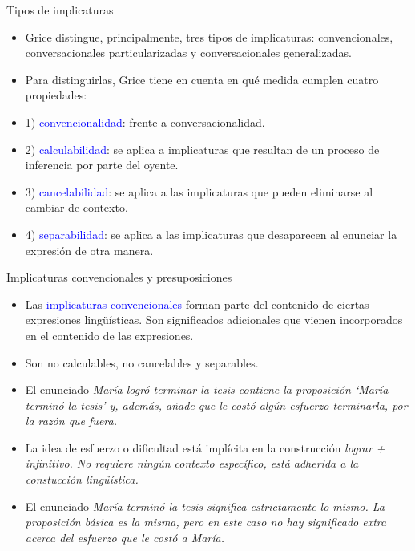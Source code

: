 \documentclass{beamer}
\begin{document}
\begin{frame}{Tipos de implicaturas}

	\begin{itemize}
		\item Grice distingue, principalmente, tres tipos de implicaturas: convencionales, conversacionales particularizadas y conversacionales generalizadas. 
		\item Para distinguirlas, Grice tiene en cuenta en qué medida cumplen cuatro propiedades:
		\item 1) \textcolor{blue}{convencionalidad}: frente a conversacionalidad.
		\item 2) \textcolor{blue}{calculabilidad}: se aplica a implicaturas que resultan de un proceso de inferencia por parte del oyente.
		\item 3) \textcolor{blue}{cancelabilidad}: se aplica a las implicaturas que pueden eliminarse al cambiar de contexto.
		\item 4) \textcolor{blue}{separabilidad}: se aplica a las implicaturas que desaparecen al enunciar la expresión de otra manera.
	\end{itemize}

\end{frame}

\begin{frame}{Implicaturas convencionales y presuposiciones}

	\begin{itemize}
		\item Las \textcolor{blue}{implicaturas convencionales} forman parte del contenido de ciertas expresiones lingüísticas. Son significados adicionales que vienen incorporados en el contenido de las expresiones.
		\item Son no calculables, no cancelables y separables.
		
		\item El enunciado \it{María logró terminar la tesis} contiene la proposición `María terminó la tesis' y, además, añade que le costó algún esfuerzo terminarla, por la razón que fuera.
		
		\item La idea de esfuerzo o dificultad está implícita en la construcción \it{lograr + infinitivo}. No requiere ningún contexto específico, está adherida a la constucción lingüística.
		
		\item El enunciado \it{María terminó la tesis} significa estrictamente lo mismo. La proposición básica es la misma, pero en este caso no hay significado extra acerca del esfuerzo que le costó a María.
	\end{itemize}

\end{frame}
\end{document}
